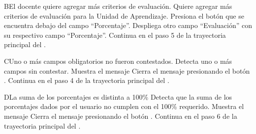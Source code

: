 
\begin{UCtrayectoriaA}{B}{El docente quiere agregar más criterios de evaluación.}
    \UCpaso[\UCactor] Quiere agregar más criterios de evaluación para la Unidad de Aprendizaje.
    \UCpaso[\UCactor] Presiona el botón  que se encuentra debajo del campo ``Porcentaje''.
    \UCpaso Despliega otro campo ``Evaluación'' con su respectivo campo ``Porcentaje''.
    \UCpaso Continua en el paso 5 de la trayectoria principal del .
\end{UCtrayectoriaA}


\begin{UCtrayectoriaA}{C}{Uno o más campos obligatorios no fueron contestados.}
	\UCpaso Detecta uno o más campos sin contestar.
    \UCpaso Muestra el mensaje 
    \UCpaso[\UCactor] Cierra el mensaje presionando el botón .
    \UCpaso Continua en el paso 4 de la trayectoria principal del .
\end{UCtrayectoriaA}


\begin{UCtrayectoriaA}{D}{La suma de los porcentajes es distinta a 100\%}
    \UCpaso Detecta que la suma de los porcentajes dados por el usuario no cumplen con el 100\% requerido.
    \UCpaso Muestra el mensaje 
    \UCpaso[\UCactor] Cierra el mensaje presionando el botón .
    \UCpaso Continua en el paso 6 de la trayectoria principal del .
\end{UCtrayectoriaA}